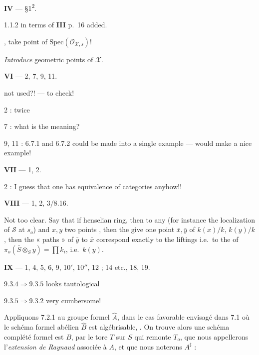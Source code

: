 \documentclass[11pt,a4paper]{article}
\begin{document}

\textbf{IV} — §1\textsuperscript{2}.

1.1.2  in terms of \textbf{III} p.\ 16 added.

, take point of $\mathrm{Spec}(\mathcal{O}_{\mathcal{X},
s})$!

\emph{Introduce} geometric points of $\mathcal{X}$.

\textbf{VI} — 2, 7, 9, 11.

not used?! — to check!

2 : twice

7 :  what is the meaning?

9, 11 : 6.7.1 and 6.7.2 could be made into a single example — would make a nice
example!

\textbf{VII} — 1, 2.

2 : I guess that one has equivalence of categories anyhow!!

\textbf{VIII} — 1, 2, 3/8.16.

Not too clear. Say that if  
 henselian ring, then to any (for instance the localization of
$\mathcal{S}$ at $s_{o}$) and  
$x, y$ two points \ill{}, then the \ill{} give one point $\bar{x}, \bar{y}$ of
$k(x)/k$, $k(y)/k$, then the « paths » of $\bar{y}$ to $\bar{x}$
 correspond exactly to the 
liftings \ill{} i.e.\ to the \ill{} of $\pi_{o}(\bar{S} \otimes_{S} y) = \prod
k_{i}$, i.e.\ $k(y)$.

\textbf{IX} — 1, 4, 5, 6, 9, 10$'$, 10$''$, 12 ; 14 etc., 18, 19.

$9.3.4 \Rightarrow 9.3.5$ looks tautological

$9.3.5 \Rightarrow 9.3.2$ very cumbersome!



Appliquons 7.2.1  au groupe formel $\hat{A}$, dans le cas
favorable envisagé dans  7.1 où le schéma  formel abélien
$\hat{B}$ est algébrisable, .
On trouve alors une   schéma   complété
formel est $B$, par le tore $T$ sur $S$ qui remonte $T_{o}$,  que
nous appellerons l'\emph{extension de Raynaud} associée à $A$, et que nous
noterons $A^{\sharp}$ :
\end{document}

